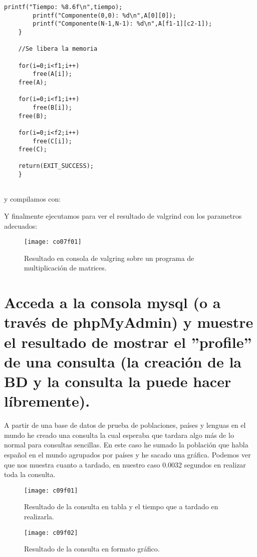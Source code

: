 \begin{lstlisting}[style=C]
		printf("Tiempo: %8.6f\n",tiempo);
		printf("Componente(0,0): %d\n",A[0][0]);
		printf("Componente(N-1,N-1): %d\n",A[f1-1][c2-1]);
	}

	//Se libera la memoria
	
	for(i=0;i<f1;i++)
		free(A[i]);
	free(A);
	
	for(i=0;i<f1;i++)
		free(B[i]);
	free(B);
	
	for(i=0;i<f2;i++)
		free(C[i]);
	free(C);
	
	return(EXIT_SUCCESS);
	}


\end{lstlisting}


y compilamos con:
	
Y finalmente ejecutamos para ver el resultado de valgrind con los parametros adecuados:

\begin{figure}[H]
\centering
\texttt{[image: co07f01]}
\caption{Resultado en consola de valgring sobre un programa de multiplicación de matrices.}
\label{fig:co07f01}
\end{figure}



\section{Acceda a la consola mysql (o a través de phpMyAdmin) y muestre el resultado de mostrar el ”profile” de una consulta (la creación de	la BD y la consulta la puede hacer líbremente).}

A partir de una base de datos de prueba de poblaciones, países y lenguas en el mundo he creado una consulta la cual esperaba que tardara algo más de lo normal para consultas sencillas. En este caso he sumado la población que habla español en el mundo agrupados por países y he sacado una gráfica. Podemos ver que nos muestra cuanto a tardado, en nuestro caso 0.0032 segundos en realizar toda la consulta.


\begin{figure}[H]
\centering
\texttt{[image: c09f01]}
\caption{Resultado de la consulta en tabla y el tiempo que a tardado en realizarla.}
\label{fig:c09f01}
\end{figure}

\begin{figure}[H]
\centering
\texttt{[image: c09f02]}
\caption{Resultado de la consulta en formato gráfico.}
\label{fig:c09f02}
\end{figure}





\clearpage


